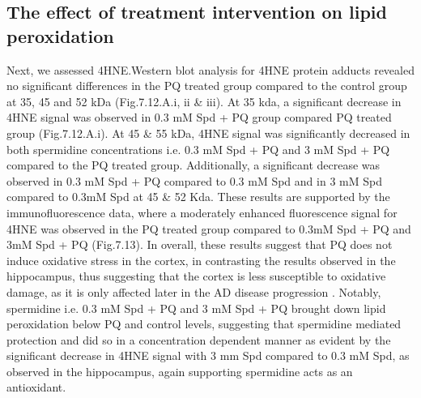 \subsection{The effect of treatment intervention on lipid peroxidation}
Next, we assessed 4HNE.Western blot analysis for 4HNE protein adducts revealed no significant differences in the PQ treated group compared to the control group at 35, 45 and 52 kDa (Fig.7.12.A.i, ii \& iii). At 35 kda, a significant decrease in 4HNE signal was observed in 0.3 mM Spd + PQ group compared PQ treated group (Fig.7.12.A.i). At 45 \& 55 kDa, 4HNE signal was significantly decreased in both spermidine concentrations i.e. 0.3 mM Spd + PQ and 3 mM Spd + PQ compared to the PQ treated group. Additionally, a significant decrease was observed in 0.3 mM Spd + PQ compared to 0.3 mM Spd and in 3 mM Spd compared to 0.3mM Spd at 45 \& 52 Kda. These results are supported by the immunofluorescence data, where a moderately enhanced fluorescence signal for 4HNE was observed in the PQ treated group compared to 0.3mM Spd + PQ and 3mM Spd + PQ (Fig.7.13). In overall, these results suggest that PQ does not induce oxidative stress in the cortex, in contrasting the results observed in the hippocampus, thus suggesting that the cortex is less susceptible to oxidative damage, as it is only affected later in the AD disease progression \citep{lumkwana2017}. Notably, spermidine i.e. 0.3 mM Spd + PQ and 3 mM Spd + PQ brought down lipid peroxidation below PQ and control levels, suggesting that spermidine mediated protection and did so in a concentration dependent manner as evident by the significant decrease in 4HNE signal with 3 mm Spd compared to 0.3 mM Spd, as observed in the hippocampus, again supporting spermidine acts as an antioxidant.

